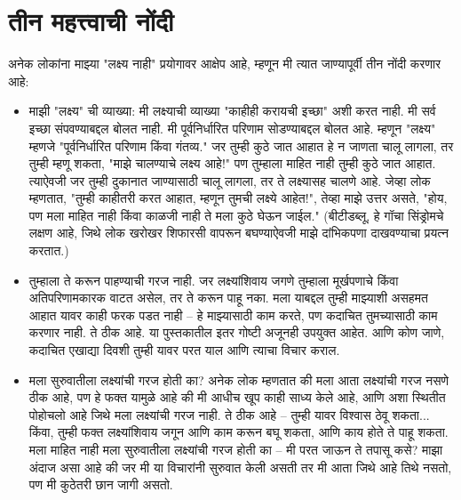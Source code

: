 \chapter{तीन महत्त्वाची नोंदी}
अनेक लोकांना माझ्या "लक्ष्य नाही" प्रयोगावर आक्षेप आहे, म्हणून मी त्यात जाण्यापूर्वी तीन नोंदी करणार आहे:

\begin{itemize}
\item माझी "लक्ष्य" ची व्याख्या: मी लक्ष्याची व्याख्या "काहीही करायची इच्छा" अशी करत नाही. मी सर्व इच्छा संपवण्याबद्दल बोलत नाही. मी पूर्वनिर्धारित परिणाम सोडण्याबद्दल बोलत आहे. म्हणून "लक्ष्य" म्हणजे "पूर्वनिर्धारित परिणाम किंवा गंतव्य." जर तुम्ही कुठे जात आहात हे न जाणता चालू लागला, तर तुम्ही म्हणू शकता, "माझे चालण्याचे लक्ष्य आहे!" पण तुम्हाला माहित नाही तुम्ही कुठे जात आहात. त्याऐवजी जर तुम्ही दुकानात जाण्यासाठी चालू लागला, तर ते लक्ष्यासह चालणे आहे. जेव्हा लोक म्हणतात, "तुम्ही काहीतरी करत आहात, म्हणून तुमची लक्ष्ये आहेत!", तेव्हा माझे उत्तर असते, "होय, पण मला माहित नाही किंवा काळजी नाही ते मला कुठे घेऊन जाईल." (बीटीडब्लू, हे गॉचा सिंड्रोमचे लक्षण आहे, जिथे लोक खरोखर शिफारसी वापरून बघण्याऐवजी माझे दांभिकपणा दाखवण्याचा प्रयत्न करतात.)
\item तुम्हाला ते करून पाहण्याची गरज नाही. जर लक्ष्यांशिवाय जगणे तुम्हाला मूर्खपणाचे किंवा अतिपरिणामकारक वाटत असेल, तर ते करून पाहू नका. मला याबद्दल तुम्ही माझ्याशी असहमत आहात यावर काही फरक पडत नाही -- हे माझ्यासाठी काम करते, पण कदाचित तुमच्यासाठी काम करणार नाही. ते ठीक आहे. या पुस्तकातील इतर गोष्टी अजूनही उपयुक्त आहेत. आणि कोण जाणे, कदाचित एखाद्या दिवशी तुम्ही यावर परत याल आणि त्याचा विचार कराल.
\item मला सुरुवातीला लक्ष्यांची गरज होती का? अनेक लोक म्हणतात की मला आता लक्ष्यांची गरज नसणे ठीक आहे, पण हे फक्त यामुळे आहे की मी आधीच खूप काही साध्य केले आहे, आणि अशा स्थितीत पोहोचलो आहे जिथे मला लक्ष्यांची गरज नाही. ते ठीक आहे -- तुम्ही यावर विश्वास ठेवू शकता... किंवा, तुम्ही फक्त लक्ष्यांशिवाय जगून आणि काम करून बघू शकता, आणि काय होते ते पाहू शकता. मला माहित नाही मला सुरुवातीला लक्ष्यांची गरज होती का -- मी परत जाऊन ते तपासू कसे? माझा अंदाज असा आहे की जर मी या विचारांनी सुरुवात केली असती तर मी आता जिथे आहे तिथे नसतो, पण मी कुठेतरी छान जागी असतो.
\end{itemize}

